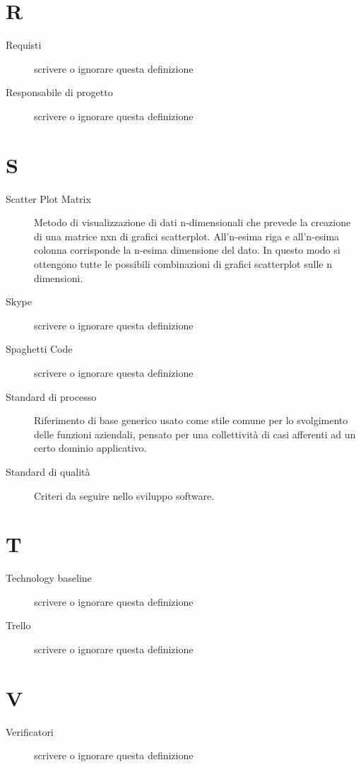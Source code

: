 \documentclass{article}
\begin{document}
\section{R}
\begin{description}
  \item[Requisti] {scrivere o ignorare questa definizione}
  \item[Responsabile di progetto] {scrivere o ignorare questa definizione}
\end{description}
\newpage
\section{S}
\begin{description}
  \item[Scatter Plot Matrix] Metodo di visualizzazione di dati n-dimensionali che prevede la creazione di una matrice nxn di grafici scatterplot. All’n-esima riga e all’n-esima colonna corrisponde la n-esima dimensione del dato. In questo modo si ottengono tutte le possibili combinazioni di grafici scatterplot sulle n dimensioni.
  \item[Skype] {scrivere o ignorare questa definizione}
  \item[Spaghetti Code] {scrivere o ignorare questa definizione}
  \item[Standard di processo] Riferimento di base generico usato come stile comune per lo svolgimento delle funzioni aziendali, pensato per una collettività di casi afferenti ad un certo dominio applicativo.
  \item[Standard di qualità] Criteri da seguire nello sviluppo software.
\end{description}
\newpage
\section{T}
\begin{description}
  \item[Technology baseline] {scrivere o ignorare questa definizione}
  \item[Trello] {scrivere o ignorare questa definizione}
\end{description}
\newpage
\section{V}
\begin{description}
  \item[Verificatori] {scrivere o ignorare questa definizione}
\end{description}
\newpage
\end{document}
